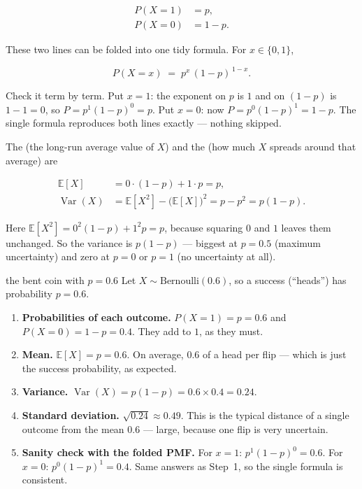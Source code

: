 \begin{align}
  P(X = 1) &= p, \\
  P(X = 0) &= 1 - p .
\end{align}

These two lines can be folded into one tidy formula. For $x \in \{0,1\}$,

\begin{equation}
  P(X = x) \;=\; p^{x}\,(1-p)^{\,1-x}.
\end{equation}

Check it term by term. Put $x = 1$: the exponent on $p$ is $1$ and on $(1-p)$ is
$1-1 = 0$, so $P = p^{1}(1-p)^{0} = p$. Put $x = 0$: now $P = p^{0}(1-p)^{1} = 1-p$.
The single formula reproduces both lines exactly --- nothing skipped.

The  (the long-run average value of $X$) and the  (how
much $X$ spreads around that average) are

\begin{align}
  \mathbb{E}[X] &= 0\cdot(1-p) + 1\cdot p = p, \\
  \operatorname{Var}(X) &= \mathbb{E}[X^2] - \big(\mathbb{E}[X]\big)^2
     = p - p^2 = p(1-p).
\end{align}

Here $\mathbb{E}[X^2] = 0^2(1-p) + 1^2 p = p$, because squaring $0$ and $1$ leaves
them unchanged. So the variance is $p(1-p)$ --- biggest at $p = 0.5$ (maximum
uncertainty) and zero at $p = 0$ or $p = 1$ (no uncertainty at all).

\begin{worked}{the bent coin with $p = 0.6$}
Let $X \sim \text{Bernoulli}(0.6)$, so a success (``heads'') has probability
$p = 0.6$.
\begin{enumerate}[label=\textbf{Step \arabic*.}]
  \item \textbf{Probabilities of each outcome.}
        $P(X=1) = p = 0.6$ and $P(X=0) = 1-p = 0.4$. They add to $1$, as they
        must.
  \item \textbf{Mean.} $\mathbb{E}[X] = p = 0.6$. On average, $0.6$ of a head per
        flip --- which is just the success probability, as expected.
  \item \textbf{Variance.} $\operatorname{Var}(X) = p(1-p) = 0.6 \times 0.4 = 0.24$.
  \item \textbf{Standard deviation.} $\sqrt{0.24} \approx 0.49$. This is the
        typical distance of a single outcome from the mean $0.6$ --- large,
        because one flip is very uncertain.
  \item \textbf{Sanity check with the folded PMF.} For $x = 1$:
        $p^{1}(1-p)^{0} = 0.6$. For $x = 0$: $p^{0}(1-p)^{1} = 0.4$. Same answers
        as Step~1, so the single formula is consistent.
\end{enumerate}
\end{worked}

